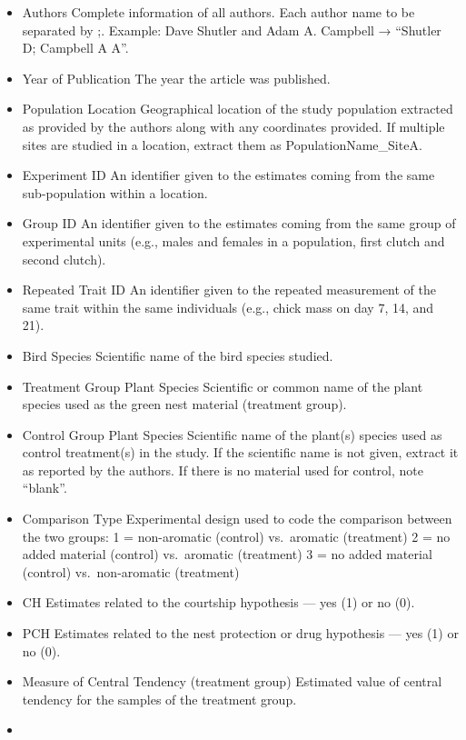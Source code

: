 \documentclass[
  number,
  review,
  onecolumn]{elsarticle}
\begin{document}
\begin{itemize}
\item
  Authors Complete information of all authors. Each author name to be
  separated by ;. Example: Dave Shutler and Adam A. Campbell → ``Shutler
  D; Campbell A A''.
\item
  Year of Publication The year the article was published.
\item
  Population Location Geographical location of the study population
  extracted as provided by the authors along with any coordinates
  provided. If multiple sites are studied in a location, extract them as
  PopulationName\_SiteA.
\item
  Experiment ID An identifier given to the estimates coming from the
  same sub-population within a location.
\item
  Group ID An identifier given to the estimates coming from the same
  group of experimental units (e.g., males and females in a population,
  first clutch and second clutch).
\item
  Repeated Trait ID An identifier given to the repeated measurement of
  the same trait within the same individuals (e.g., chick mass on day 7,
  14, and 21).
\item
  Bird Species Scientific name of the bird species studied.
\item
  Treatment Group Plant Species Scientific or common name of the plant
  species used as the green nest material (treatment group).
\item
  Control Group Plant Species Scientific name of the plant(s) species
  used as control treatment(s) in the study. If the scientific name is
  not given, extract it as reported by the authors. If there is no
  material used for control, note ``blank''.
\item
  Comparison Type Experimental design used to code the comparison
  between the two groups: 1 = non-aromatic (control) vs.~aromatic
  (treatment) 2 = no added material (control) vs.~aromatic (treatment) 3
  = no added material (control) vs.~non-aromatic (treatment)
\item
  CH Estimates related to the courtship hypothesis --- yes (1) or no
  (0).
\item
  PCH Estimates related to the nest protection or drug hypothesis ---
  yes (1) or no (0).
\item
  Measure of Central Tendency (treatment group) Estimated value of
  central tendency for the samples of the treatment group.
\item

\end{itemize}
\end{document}
